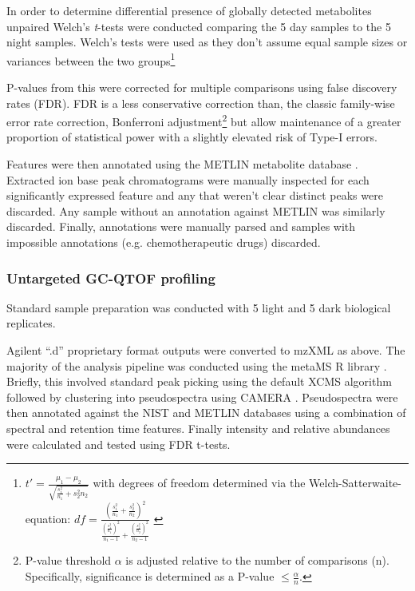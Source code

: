 In order to determine differential presence of globally detected metabolites
unpaired Welch's \textit{t}-tests were conducted comparing the 5 day samples to the 5
night samples. Welch's tests were used as they don't assume equal sample sizes or variances
between the two groups\citep{Welch1947}\footnote{
    \(t' = \frac{\mu_1 - \mu_2}{\sqrt{\frac{s^2_1}{n_1} + {s^2_2}{n_2}}}\)
    with degrees of freedom determined via the Welch-Satterwaite-equation:
    \(df = \frac{(\frac{s^2_1}{n_1} + \frac{s^2_2}{n_2})^2}{\frac{(\frac{s^2_1}{n_1})^2}{n_1 - 1} + \frac{(\frac{s^2_2}{n_2})^2}{n_2 - 1}}\)
    \citep{Ruxton2006}
}

P-values from this were corrected 
for multiple comparisons using false discovery rates (FDR).  FDR is a
less conservative correction than, the classic family-wise error rate correction,
Bonferroni adjustment\footnote{
    P-value threshold \(\alpha\) is adjusted relative to the number of comparisons (n). 
Specifically, significance is determined as a P-value \(\leq \frac{\alpha}{n}\).} but
allow maintenance of a greater proportion of statistical power with a 
slightly elevated risk of Type-I errors. 

Features were then annotated using the METLIN metabolite database \citep{Smith2005a,Sana2008,Tautenhahn2012a}.
Extracted ion base peak chromatograms were manually inspected for each significantly expressed feature
and any that weren't clear distinct peaks were discarded. Any sample without
an annotation against METLIN was similarly discarded. Finally, annotations
were manually parsed and samples with impossible annotations (e.g. 
chemotherapeutic drugs) discarded.  

\subsubsection{Untargeted GC-QTOF profiling}

Standard sample preparation was conducted 
with 5 light and 5 dark biological replicates.  

Agilent ``.d'' proprietary format outputs were converted to mzXML as above.
The majority of the analysis pipeline was conducted using the metaMS R library
\citep{Wehrens2014}.  Briefly, this involved standard peak picking using the
default XCMS algorithm \citep{Smith2006} followed by clustering into
pseudospectra using CAMERA \citep{Kuhl2012}.  Pseudospectra were then annotated
against the NIST and METLIN databases using a combination of spectral
and retention time features.  Finally intensity and relative abundances
were calculated and tested using FDR t-tests.

